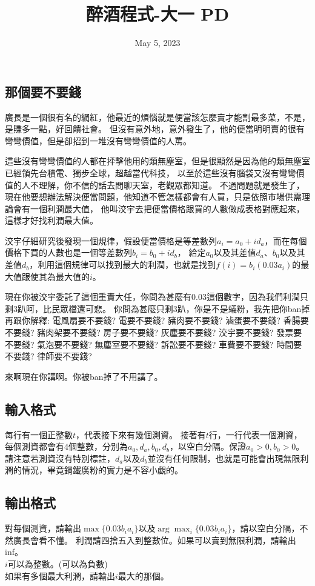 \documentclass{article}
\title{醉酒程式-大一 PD}
\date{May 5, 2023}
\begin{document}
\begin{CJK*}{UTF8}{bsmi}

\maketitle

\section*{那個要不要錢}
廣長是一個很有名的網紅，他最近的煩惱就是便當該怎麼賣才能割最多菜，不是，是賺多一點，好回饋社會。
但沒有意外地，意外發生了，他的便當明明賣的很有彎彎價值，但是卻招到一堆沒有彎彎價值的人罵。

這些沒有彎彎價值的人都在抨擊他用的類無塵室，但是很顯然是因為他的類無塵室已經領先台積電、獨步全球，超越當代科技，
以至於這些沒有腦袋又沒有彎彎價值的人不理解，你不信的話去問聊天室，老觀眾都知道。
不過問題就是發生了，現在他要想辦法解決便當問題，他知道不管怎樣都會有人買，只是依照市場供需理論會有一個利潤最大值，
他叫洨宇去把便當價格跟買的人數做成表格對應起來，這樣才好找利潤最大值。

洨宇仔細研究後發現一個規律，假設便當價格是等差數列$a_i=a_0+id_a$，而在每個價格下買的人數也是一個等差數列$b_i=b_0+id_b$，
給定$a_0$以及其差值$d_a$、$b_0$以及其差值$d_b$，利用這個規律可以找到最大的利潤，也就是找到$f(i)=b_i(0.03a_i)$的最大值跟使其為最大值的$i$。

現在你被洨宇委託了這個重責大任，你問為甚麼有$0.03$這個數字，因為我們利潤只剩$3$趴阿，比民眾檔還可悲。
你問為甚麼只剩$3$趴，你是不是蟻粉，我先把你ban掉再跟你解釋:
電風扇要不要錢? 電要不要錢? 豬肉要不要錢? 滷蛋要不要錢? 香腸要不要錢? 豬肉架要不要錢? 房子要不要錢? 灰塵要不要錢? 
洨宇要不要錢? 發票要不要錢? 氣泡要不要錢? 無塵室要不要錢? 訴訟要不要錢? 車費要不要錢? 時間要不要錢? 律師要不要錢?

來啊現在你講啊。你被ban掉了不用講了。

\subsection*{輸入格式}
每行有一個正整數$t$，代表接下來有幾個測資。
接著有$t$行，一行代表一個測資，每個測資都會有$4$個整數，分別為$a_0,d_a,b_0,d_b$，以空白分隔。保證$a_0>0,b_0>0$。
請注意若測資沒有特別標註，$d_a$以及$d_b$並沒有任何限制，也就是可能會出現無限利潤的情況，畢竟鋼鐵廣粉的實力是不容小覷的。

\subsection*{輸出格式}
對每個測資，請輸出$\max\{0.03b_ia_i\}$以及$\arg\max_i\{0.03b_ia_i\}$，請以空白分隔，不然廣長會看不懂。
利潤請四捨五入到整數位。如果可以賣到無限利潤，請輸出inf。\\
$i$可以為整數。(可以為負數)\\
如果有多個最大利潤，請輸出$i$最大的那個。


\end{CJK*}
\end{document}

